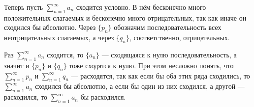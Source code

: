 \documentclass[a4paper, 12pt]{article}
\begin{document}
	
	Теперь пусть $\sum\limits_{n=1}^{\infty}a_n$ сходится условно. В нём бесконечно много положительных слагаемых и бесконечно много отрицательных, так как иначе он сходился бы абсолютно. Через $\{p_n\}$ обозначим последовательность всех неотрицательных слагаемых, а через $\{q_n\}$, соответственно, отрицательных. 
	
	Раз $\sum\limits_{n=1}^{\infty}a_n$ сходится, то $\{a_n\}$ --- сходящаяся к нулю последовательность, а значит и $\{p_n\}$ и $\{q_n\}$ тоже сходятся  к нулю.
	При этом несложно понять, что $\sum\limits_{n=1}^{\infty}p_n$ и $\sum\limits_{n=1}^{\infty}q_n$ --- расходятся, так как если бы оба этих ряда сходились, то $\sum\limits_{n=1}^{\infty}a_n$ сходился бы абсолютно, а если бы один из них сходился, а другой --- расходился, то  $\sum\limits_{n=1}^{\infty}a_n$ бы расходился.
	
\end{document}
